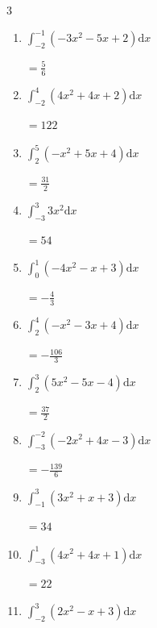 \begin{multicols}{3}
\begin{enumerate}
        $\displaystyle =\frac{37}{3}$

  \item $\displaystyle \int_{-2}^{-1}\left( -3x^{2}-5x+2 \right) \mathrm{d}x$

        $\displaystyle =\frac{5}{6}$

  \item $\displaystyle \int_{-2}^{4}\left( 4x^{2}+4x+2 \right) \mathrm{d}x$

        $\displaystyle =122$

\columnbreak %

  \item $\displaystyle \int_{2}^{5}\left( -x^{2}+5x+4 \right) \mathrm{d}x$

        $\displaystyle =\frac{31}{2}$

  \item $\displaystyle \int_{-3}^{3}3x^{2} \mathrm{d}x$

        $\displaystyle =54$

  \item $\displaystyle \int_{0}^{1}\left( -4x^{2}-x+3 \right) \mathrm{d}x$

        $\displaystyle =-\frac{4}{3}$

  \item $\displaystyle \int_{2}^{4}\left( -x^{2}-3x+4 \right) \mathrm{d}x$

        $\displaystyle =-\frac{106}{3}$

  \item $\displaystyle \int_{2}^{3}\left( 5x^{2}-5x-4 \right) \mathrm{d}x$

        $\displaystyle =\frac{37}{2}$

\columnbreak %

\resetques

  \item $\displaystyle \int_{-3}^{-2}\left( -2x^{2}+4x-3 \right) \mathrm{d}x$

        $\displaystyle =-\frac{139}{6}$

  \item $\displaystyle \int_{-1}^{3}\left( 3x^{2}+x+3 \right) \mathrm{d}x$

        $\displaystyle =34$

  \item $\displaystyle \int_{-3}^{1}\left( 4x^{2}+4x+1 \right) \mathrm{d}x$

        $\displaystyle =22$

  \item $\displaystyle \int_{-2}^{3}\left( 2x^{2}-x+3 \right) \mathrm{d}x$


\end{enumerate}
\end{multicols}
